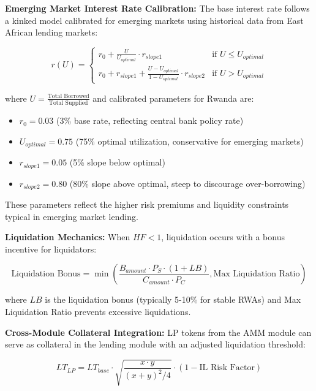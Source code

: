 \documentclass[12pt]{article}
\begin{document}
\textbf{Emerging Market Interest Rate Calibration:}
The base interest rate follows a kinked model calibrated for emerging markets using historical data from East African lending markets:

\begin{equation}
r(U) = \begin{cases}
r_0 + \frac{U}{U_{optimal}} \cdot r_{slope1} & \text{if } U \leq U_{optimal} \\
r_0 + r_{slope1} + \frac{U - U_{optimal}}{1 - U_{optimal}} \cdot r_{slope2} & \text{if } U > U_{optimal}
\end{cases}
\end{equation}

where $U = \frac{\text{Total Borrowed}}{\text{Total Supplied}}$ and calibrated parameters for Rwanda are:
\begin{itemize}
\item $r_0 = 0.03$ (3\% base rate, reflecting central bank policy rate)
\item $U_{optimal} = 0.75$ (75\% optimal utilization, conservative for emerging markets)
\item $r_{slope1} = 0.05$ (5\% slope below optimal)
\item $r_{slope2} = 0.80$ (80\% slope above optimal, steep to discourage over-borrowing)
\end{itemize}

These parameters reflect the higher risk premiums and liquidity constraints typical in emerging market lending.

\textbf{Liquidation Mechanics:}
When $HF < 1$, liquidation occurs with a bonus incentive for liquidators:

\begin{equation}
\text{Liquidation Bonus} = \min\left(\frac{B_{amount} \cdot P_S \cdot (1 + LB)}{C_{amount} \cdot P_C}, \text{Max Liquidation Ratio}\right)
\end{equation}

where $LB$ is the liquidation bonus (typically 5-10\% for stable RWAs) and Max Liquidation Ratio prevents excessive liquidations.

\textbf{Cross-Module Collateral Integration:}
LP tokens from the AMM module can serve as collateral in the lending module with an adjusted liquidation threshold:

\begin{equation}
LT_{LP} = LT_{base} \cdot \sqrt{\frac{x \cdot y}{(x + y)^2/4}} \cdot (1 - \text{IL Risk Factor})
\end{equation}
\end{document}
